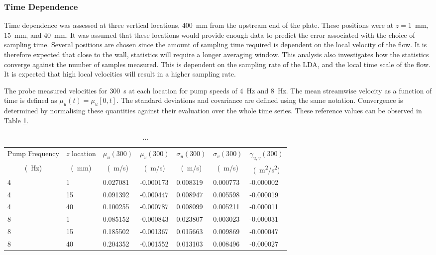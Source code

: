 \documentclass[12pt,oneside,a4paper]{article}
\begin{document}
\subsubsection{Time Dependence}
\label{section:experiments:timeDep}

Time dependence was assessed at three vertical locations, \SI{400}{mm} from the upstream end of the plate. These positions were at $z=$\SI{1}{mm}, \SI{15}{mm}, and \SI{40}{mm}. It was assumed that these locations would provide enough data to predict the error associated with the choice of sampling time. Several positions are chosen since the amount of sampling time required is dependent on the local velocity of the flow. It is therefore expected that close to the wall, statistics will require a longer averaging window. This analysis also investigates how the statistics converge against the number of samples measured. This is dependent on the sampling rate of the LDA, and the local time scale of the flow. It is expected that high local velocities will result in a higher sampling rate.

 The probe measured velocities for \SI{300}{s} at each location for pump speeds of \SI{4}{Hz} and \SI{8}{Hz}. The mean streamwise velocity as a function of time is defined as $\mu_u (t) = \mu_u[0,t]$. The standard deviations and covariance are defined using the same notation. Convergence is determined by normalising these quantities against their evaluation over the whole time series. These reference values can be observed in Table \ref{table:experiments:convergedStatistics}.
 \begin{table}[!h]
 \centering
 \caption{...}
 \label{table:experiments:convergedStatistics}
 \begin{tabular}{l l l l l l l}
 \hline
 Pump Frequency	&	$z$ location	&	$\mu_u(300)$	&	$\mu_v(300)$	&	$\sigma_u(300)$	&	$\sigma_v(300)$	&	$\gamma_{u,v}(300)$	\\
 \multicolumn{1}{c}{(\SI{}{Hz})}	&	\multicolumn{1}{c}{(\SI{}{mm})}	&	\multicolumn{1}{c}{(\SI{}{m/s})}	&	\multicolumn{1}{c}{(\SI{}{m/s})}	&	\multicolumn{1}{c}{(\SI{}{m/s})}	& \multicolumn{1}{c}{(\SI{}{m/s})}	& \multicolumn{1}{c}{(\SI{}{m^2/s^2})}	\\
%
\hline
4	&	1	&	0.027081	&	-0.000173	&	0.008319	&	0.000773	&	-0.000002	\\
4	&	15	&	0.091392	&	-0.000447	&	0.008947	&	0.005598	&	-0.000019	\\
4	&	40	&	0.100255	&	-0.000787	&	0.008099	&	0.005211	&	-0.000011	\\
8	&	1	&	0.085152	&	-0.000843	&	0.023807	&	0.003023	&	-0.000031	\\
8	&	15	&	0.185502	&	-0.001367	&	0.015663	&	0.009869	&	-0.000047	\\
8	&	40	&	0.204352	&	-0.001552	&	0.013103	&	0.008496	&	-0.000027	\\
\hline
 
 \end{tabular}
 \end{table}
\end{document}
